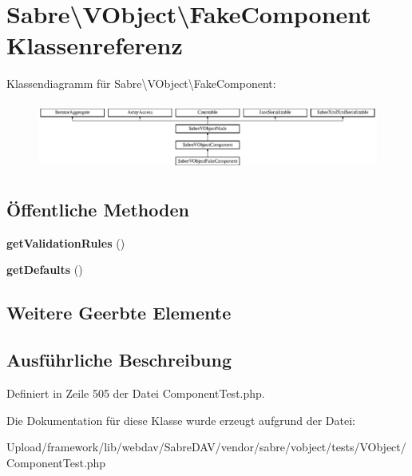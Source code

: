 \hypertarget{class_sabre_1_1_v_object_1_1_fake_component}{}\section{Sabre\textbackslash{}V\+Object\textbackslash{}Fake\+Component Klassenreferenz}
\label{class_sabre_1_1_v_object_1_1_fake_component}
Klassendiagramm für Sabre\textbackslash{}V\+Object\textbackslash{}Fake\+Component\+:\begin{figure}[H]
\begin{center}
\leavevmode
\includegraphics[height=2.251256cm]{class_sabre_1_1_v_object_1_1_fake_component}
\end{center}
\end{figure}
\subsection*{Öffentliche Methoden}
\begin{DoxyCompactItemize}
\item 
\mbox{\label{class_sabre_1_1_v_object_1_1_fake_component_ad11fd28858135742b269735949ddb43e}} 
{\bfseries get\+Validation\+Rules} ()
\item 
\mbox{\label{class_sabre_1_1_v_object_1_1_fake_component_a71f2619e4a7033a9b2c90264eefeeaa2}} 
{\bfseries get\+Defaults} ()
\end{DoxyCompactItemize}
\subsection*{Weitere Geerbte Elemente}


\subsection{Ausführliche Beschreibung}


Definiert in Zeile 505 der Datei Component\+Test.\+php.



Die Dokumentation für diese Klasse wurde erzeugt aufgrund der Datei\+:\begin{DoxyCompactItemize}
\item 
Upload/framework/lib/webdav/\+Sabre\+D\+A\+V/vendor/sabre/vobject/tests/\+V\+Object/Component\+Test.\+php\end{DoxyCompactItemize}
